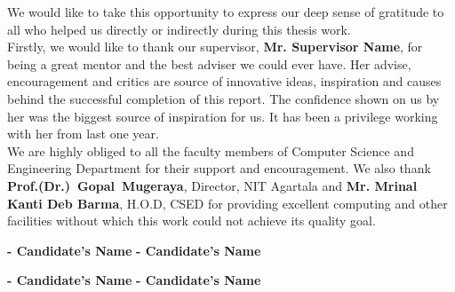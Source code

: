 \documentclass[english,a4paper,babel,12pt]{nitathesis}
\numberwithin{figure}{chapter}
\begin{document}



\beforepreface
{}
We would like to take this opportunity to express our deep sense of gratitude to all who helped us directly or indirectly
 during this thesis work.\\
Firstly, we would like to thank our supervisor, \textbf{Mr. Supervisor Name}, for being a great mentor and the best adviser 
we could ever have. Her advise, encouragement and critics are source of innovative ideas, inspiration and causes behind the successful completion of this report. The confidence shown on us  by her was the biggest source of inspiration for us. It has been a privilege working with her from last one year.\\
We are highly obliged to all the faculty members of Computer Science and Engineering Department for their support and encouragement. We also thank  \textbf{Prof.(Dr.)~Gopal~Mugeraya}, Director, NIT Agartala and \textbf {Mr. Mrinal Kanti Deb Barma}, H.O.D, CSED for providing excellent computing and other facilities without which this work could not achieve its quality goal.\\


\begin{comment}
 Finally, I am grateful to my \textbf{parents} for their support. It was impossible for me to complete 
this thesis work without their love, blessing  and
encouragement.
\end{comment}

\vspace*{0.5cm} 
\hspace*{1cm}\textbf{\large - Candidate's Name}
\hspace*{6cm}\textbf{\large - Candidate's Name}

\vspace*{0.5cm} 
\hspace*{1cm}\textbf{\large - Candidate's Name}
\hspace*{6cm}\textbf{\large - Candidate's Name}
 

\pagestyle{fancy}
\fancyhead[RO,RE]{\nouppercase\rightmark}
\fancyfoot[C]{\thepage}
\listoffigures
\listoftables
\newpage
{}
\blindtext
\end{document}
